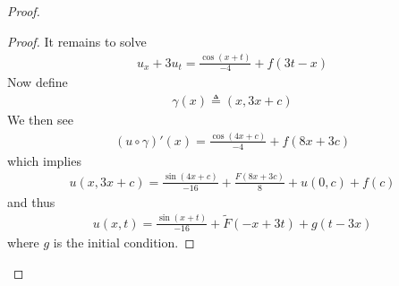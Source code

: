 \documentclass{report}
\begin{document}
\begin{proof}
\begin{proof}
It remains to solve 
\begin{align*}
u_x+ 3u_t= \frac{\cos (x+t)}{-4}+ f(3t-x)
\end{align*}
Now define 
\begin{align*}
\gamma  (x)\triangleq  (x,3x+c)
\end{align*}
We then see 
\begin{align*}
  (u\circ \gamma )'(x)= \frac{\cos (4x+c)}{-4} + f(8x+3c)
\end{align*}
which implies 
\begin{align*}
u(x,3x+c)= \frac{\sin (4x+c)}{-16}+\frac{F(8x+3c)}{8}+u(0,c)+f(c)
\end{align*}
and thus 
\begin{align*}
u(x,t)= \frac{\sin (x+t)}{-16}+ \tilde{F}(-x+3t)+ g(t-3x)
\end{align*}
where $g$ is the initial condition. 
\end{proof}

\end{proof}
\end{document}
